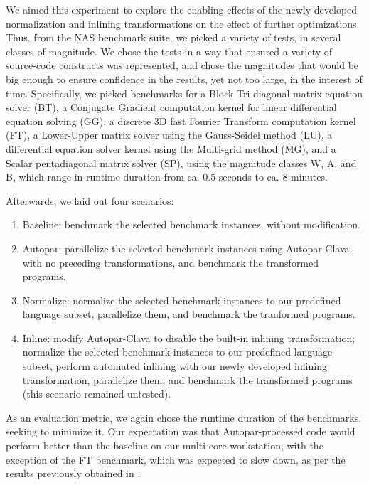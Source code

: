 We aimed this experiment to explore the enabling effects of the newly developed normalization and inlining transformations on the effect of further optimizations. Thus, from the NAS benchmark suite, we picked a variety of tests, in several classes of magnitude. We chose the tests in a way that ensured a variety of source-code constructs was represented, and chose the magnitudes that would be big enough to ensure confidence in the results, yet not too large, in the interest of time. Specifically, we picked benchmarks for a Block Tri-diagonal matrix equation solver (BT), a Conjugate Gradient computation kernel for linear differential equation solving (GG), a discrete 3D fast Fourier Transform computation kernel (FT), a Lower-Upper matrix solver using the Gauss-Seidel method (LU), a differential equation solver kernel using the Multi-grid method (MG), and a Scalar pentadiagonal matrix solver (SP), using the magnitude classes W, A, and B, which range in runtime duration from ca. 0.5 seconds to ca. 8 minutes.

Afterwards, we laid out four scenarios:

\begin{enumerate}
    \item Baseline: benchmark the selected benchmark instances, without modification.
    \item Autopar: parallelize the selected benchmark instances using Autopar-Clava, with no preceding transformations, and benchmark the transformed programs.
    \item Normalize: normalize the selected benchmark instances to our predefined language subset, parallelize them, and benchmark the tranformed programs.
    \item Inline: modify Autopar-Clava to disable the built-in inlining transformation; normalize the selected benchmark instances to our predefined language subset, perform automated inlining with our newly developed inlining transformation, parallelize them, and benchmark the transformed programs (this scenario remained untested).
\end{enumerate}

As an evaluation metric, we again chose the runtime duration of the benchmarks, seeking to minimize it. Our expectation was that Autopar-processed code would perform better than the baseline on our multi-core workstation, with the exception of the FT benchmark, which was expected to slow down, as per the results previously obtained in \cite{Arabnejad2020}.

